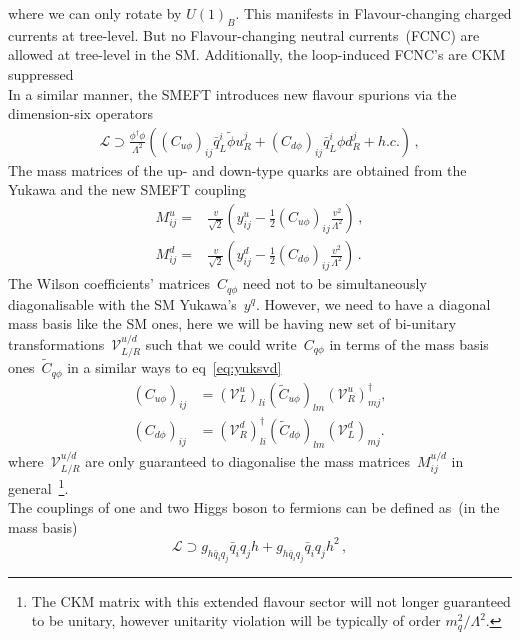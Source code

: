 where we can only rotate by $U(1)_B$. This manifests in Flavour-changing charged currents at tree-level. But no Flavour-changing neutral currents~(FCNC) are allowed at tree-level in the SM. Additionally, the loop-induced FCNC's are CKM suppressed\\
In a similar manner, the SMEFT introduces new flavour spurions via the dimension-six operators
\begin{align}
	\mathcal{L} \supset \frac{\phi^{\dagger}\phi}{\Lambda^2}\left( (C_{u\phi})_{ij} \bar{q}_L^i \tilde{\phi} u_R^j + (C_{d\phi})_{ij} \bar{q}_L^i \phi d_R^j +h.c.\right)\,,
\end{align}
The mass matrices of the up- and down-type quarks are obtained from the Yukawa and the new SMEFT coupling 
\begin{align}
	M^u_{ij} =& \frac{v}{\sqrt{2}} \left( y^u_{ij}-\frac{1}{2} (C_{u\phi})_{ij}\frac{v^2}{\Lambda^2}\right)\,,\nonumber\\
	M^d_{ij} =& \frac{v}{\sqrt{2}} \left( y^d_{ij}-\frac{1}{2} (C_{d\phi})_{ij}\frac{v^2}{\Lambda^2}\right)\,. \label{eq:mass}
\end{align}
The Wilson coefficients' matrices~$C_{q\phi}$ need not to be simultaneously diagonalisable with the SM Yukawa's~$y^q$. However, we need to have a diagonal mass basis like the SM ones, here we will be having new set of bi-unitary transformations~$\mathcal{V}_{L/R}^{u/d}$ such that we could write~$C_{q\phi}$ in terms of the mass basis ones~$\tilde{C}_{q\phi}$ in a similar ways to   eq~\eqref{eq:yuksvd}
\begin{align}
	(C_{u\phi})_{ij}&= (\mathcal{V}_{L}^{u})_{li}(\tilde{C}_{u\phi})_{lm} (\mathcal{V}_R^{u})^\dagger_{mj},\nonumber \\
	(C_{d\phi})_{ij}&=(\mathcal{V}_{R}^{d})^\dagger_{li} (\tilde{C}_{d\phi})_{lm} (\mathcal{V}_L^{d})_{mj}.
	\label{eq_defV}
\end{align}
where~$\mathcal{V}_{L/R}^{u/d}$ are only guaranteed to diagonalise the mass matrices~$M^{u/d}_{ij}$ in general~\footnote{The CKM matrix with this extended flavour sector will not longer guaranteed to be unitary, however unitarity violation will be typically of order $m_q^2/\Lambda^2$.  }.   \\
The couplings of one and two Higgs boson to fermions can be defined as~(in the mass basis)
\begin{equation}
	\mathcal{L}\supset g_{h\bar{q}_i q_j}\bar{q}_i q_j h + g_{h\bar{q}_i q_j}\bar{q}_i q_j h^2\,,
\end{equation} 
